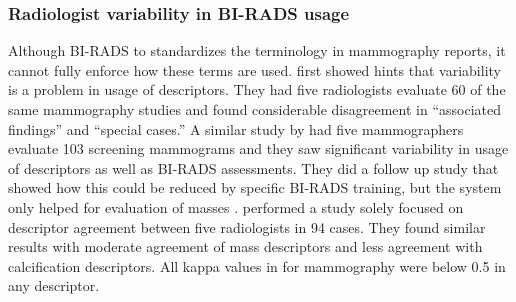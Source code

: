 \subsubsection{Radiologist variability in BI-RADS usage}
Although BI-RADS to standardizes the terminology in mammography reports, it cannot fully enforce how these terms are used.  first showed hints that variability is a problem in usage of descriptors. They had five radiologists evaluate 60 of the same mammography studies and found considerable disagreement in ``associated findings'' and ``special cases.'' A similar study by  had five mammographers evaluate 103 screening mammograms and they saw significant variability in usage of descriptors as well as BI-RADS assessments. They did a follow up study that showed how this could be reduced by specific BI-RADS training, but the system only helped for evaluation of masses \cite{Berg:2002fy}.  performed a study solely focused on descriptor agreement between five radiologists in 94 cases. They found similar results with moderate agreement of mass descriptors and less agreement with calcification descriptors. All kappa values in for mammography were below 0.5 in any descriptor.


